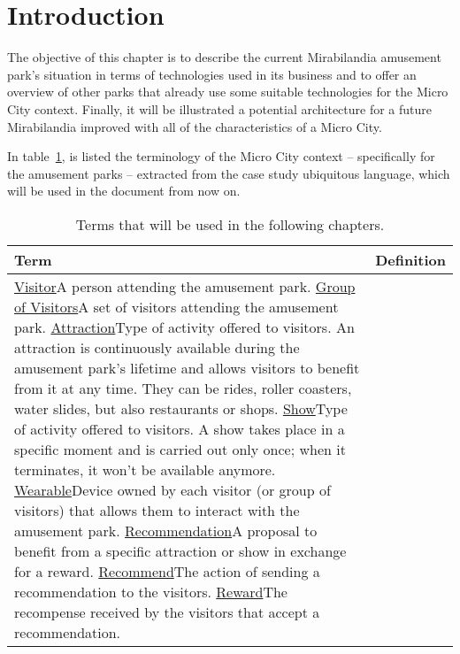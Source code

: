 \section*{Introduction}
\label{sec:introduction}

The objective of this chapter is to describe the current Mirabilandia amusement park's situation in terms of technologies used in its business and to offer an overview of other parks that already use some suitable technologies for the Micro City context.
Finally, it will be illustrated a potential architecture for a future Mirabilandia improved with all of the characteristics of a Micro City.

In table~\ref{tab:terms}, is listed the terminology of the Micro City context -- specifically for the amusement parks -- extracted from the case study ubiquitous language, which will be used in the document from now on.

\begin{longtable}{|l|p{}|}
	\hline
	\textbf{Term} & \textbf{Definition} \\
	\hline
	\ul{Visitor}{A person attending the amusement park.}
	\ul{Group of Visitors}{A set of visitors attending the amusement park.}
	\ul{Attraction}{Type of activity offered to visitors. An attraction is continuously available during the amusement park's lifetime and allows visitors to benefit from it at any time. They can be rides, roller coasters, water slides, but also restaurants or shops.}
	\ul{Show}{Type of activity offered to visitors. A show takes place in a specific moment and is carried out only once; when it terminates, it won't be available anymore.}
	\ul{Wearable}{Device owned by each visitor (or group of visitors) that allows them to interact with the amusement park.}
	\ul{Recommendation}{A proposal to benefit from a specific attraction or show in exchange for a reward.}
	\ul{Recommend}{The action of sending a recommendation to the visitors.}
	\ul{Reward}{The recompense received by the visitors that accept a recommendation.}
	\caption{Terms that will be used in the following chapters.}
	\label{tab:terms}
\end{longtable}